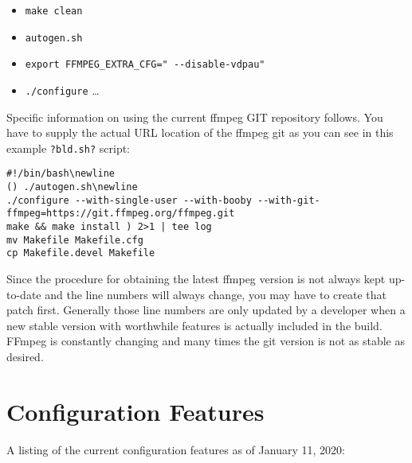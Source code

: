 \begin{itemize}[label={},nosep]
	\item \texttt{make clean}
	\item \texttt{autogen.sh}
	\item \texttt{export FFMPEG\_EXTRA\_CFG=" -{}-disable-vdpau"} 
	\item \texttt{./configure} {\dots}
\end{itemize}

Specific information on using the current ffmpeg GIT repository follows.  You have to supply the actual URL location of the ffmpeg git as you can see in this example \texttt{?bld.sh?} script:

\begin{lstlisting}[numbers=none]
#!/bin/bash\newline
() ./autogen.sh\newline
./configure --with-single-user --with-booby --with-git-ffmpeg=https://git.ffmpeg.org/ffmpeg.git
make && make install ) 2>1 | tee log
mv Makefile Makefile.cfg
cp Makefile.devel Makefile
\end{lstlisting}

Since the procedure for obtaining the latest ffmpeg version is not always kept up-to-date and the line numbers will always change, you may have to create that patch first. Generally those line numbers are only updated by a developer when a new stable version with worthwhile features is actually included in the \CGG{} build. FFmpeg is constantly changing and many times the git version is not as stable as desired.

\section{Configuration Features}
\label{sec:configuration_features}

A listing of the current configuration features as of January 11, 2020:

